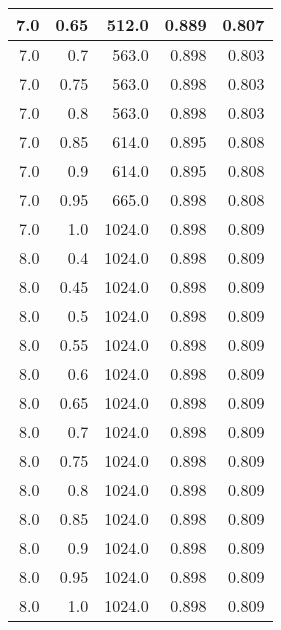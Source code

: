 \begin{center}
\begin{longtable}{|r|r|r|r|r|}
\hline
7.0 & 0.65 & 512.0 & 0.889 & 0.807 \\
\hline
7.0 & 0.7 & 563.0 & 0.898 & 0.803 \\
\hline
7.0 & 0.75 & 563.0 & 0.898 & 0.803 \\
\hline
7.0 & 0.8 & 563.0 & 0.898 & 0.803 \\
\hline
7.0 & 0.85 & 614.0 & 0.895 & 0.808 \\
\hline
7.0 & 0.9 & 614.0 & 0.895 & 0.808 \\
\hline
7.0 & 0.95 & 665.0 & 0.898 & 0.808 \\
\hline
7.0 & 1.0 & 1024.0 & 0.898 & 0.809 \\
\hline
8.0 & 0.4 & 1024.0 & 0.898 & 0.809 \\
\hline
8.0 & 0.45 & 1024.0 & 0.898 & 0.809 \\
\hline
8.0 & 0.5 & 1024.0 & 0.898 & 0.809 \\
\hline
8.0 & 0.55 & 1024.0 & 0.898 & 0.809 \\
\hline
8.0 & 0.6 & 1024.0 & 0.898 & 0.809 \\
\hline
8.0 & 0.65 & 1024.0 & 0.898 & 0.809 \\
\hline
8.0 & 0.7 & 1024.0 & 0.898 & 0.809 \\
\hline
8.0 & 0.75 & 1024.0 & 0.898 & 0.809 \\
\hline
8.0 & 0.8 & 1024.0 & 0.898 & 0.809 \\
\hline
8.0 & 0.85 & 1024.0 & 0.898 & 0.809 \\
\hline
8.0 & 0.9 & 1024.0 & 0.898 & 0.809 \\
\hline
8.0 & 0.95 & 1024.0 & 0.898 & 0.809 \\
\hline
8.0 & 1.0 & 1024.0 & 0.898 & 0.809 \\
\hline
\end{longtable}
\end{center}
